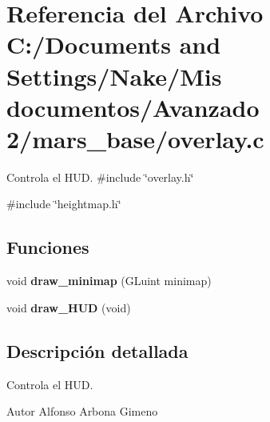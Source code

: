 \section{Referencia del Archivo C:/Documents and Settings/Nake/Mis documentos/Avanzado 2/mars\_\-base/overlay.c}
\label{overlay_8c}


Controla el HUD.  
{\ttfamily \#include \char`\"{}overlay.h\char`\"{}}\par
{\ttfamily \#include \char`\"{}heightmap.h\char`\"{}}\par
\subsection*{Funciones}
\begin{DoxyCompactItemize}
\item 
void {\bfseries draw\_\-minimap} (GLuint minimap)\label{overlay_8c_acee6eec211829d1a95c5e77b61f84885}

\item 
void {\bfseries draw\_\-HUD} (void)\label{overlay_8c_a5aaa9b14296618d040f503e8cdcc029e}

\end{DoxyCompactItemize}


\subsection{Descripción detallada}
Controla el HUD. \begin{DoxyAuthor}{Autor}
Alfonso Arbona Gimeno 
\end{DoxyAuthor}
